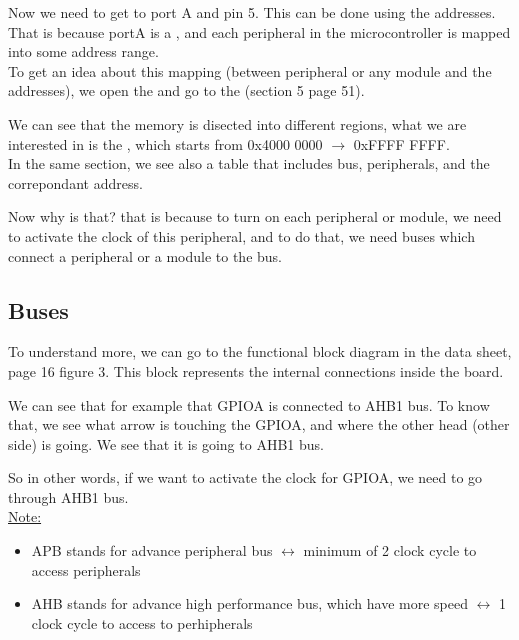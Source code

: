 \documentclass[12pt,a4paper]{book}
\begin{document}
Now we need to get to port A and pin 5. This can be done using the addresses. That is because portA is a , and each peripheral in the microcontroller is mapped into some address range.\\

To get an idea about this mapping (between peripheral or any module and the addresses), we open the  and go to the  (section 5 page 51).

We can see that the memory is disected into different regions, what we are interested in is the , which starts from 0x4000 0000 $\rightarrow$ 0xFFFF FFFF.\\

In the same section, we see also a table that includes bus, peripherals, and the correpondant address.

Now why is that? that is because to turn on each peripheral or module, we need to activate the clock of this peripheral, and to do that, we need buses which connect a peripheral or a module to the bus.\\

\subsection{Buses}

To understand more, we can go to the functional block diagram in the data sheet, page 16 figure 3. This block represents the internal connections inside the board.

We can see that for example that GPIOA is connected to AHB1 bus.
To know that, we see what arrow is touching the GPIOA, and where the other head (other side) is going. We see that it is going to AHB1 bus. 

So in other words, if we want to activate the clock for GPIOA, we need to go through AHB1 bus.\\

\underline{Note:}

    \begin{itemize}
        \item APB stands for advance peripheral bus $\leftrightarrow$ minimum of 2 clock cycle to access peripherals

        \item  AHB stands for advance high performance bus, which have more speed $\leftrightarrow$ 1 clock cycle to access to perhipherals
    \end{itemize}
\end{document}
